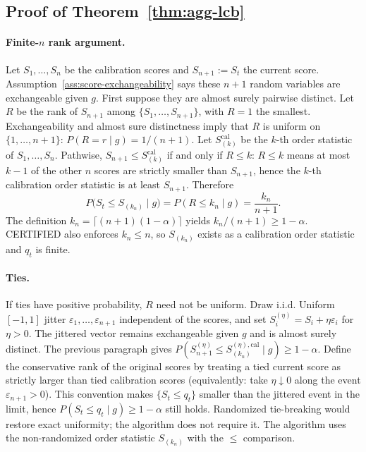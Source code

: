 \subsection{Proof of Theorem~\ref{thm:agg-lcb}}
\label{app:proof_agg_lcb}

\paragraph{Finite-$n$ rank argument.}
Let $S_1,\ldots,S_n$ be the calibration scores and $S_{n+1}:=S_t$ the current
score.  Assumption~\ref{ass:score-exchangeability} says these $n+1$ random
variables are exchangeable given $g$.  First suppose they are almost surely
pairwise distinct.  Let $R$ be the rank of $S_{n+1}$ among
$\{S_1,\ldots,S_{n+1}\}$, with $R=1$ the smallest.  Exchangeability and almost
sure distinctness imply that $R$ is uniform on $\{1,\ldots,n+1\}$:
$P(R=r\mid g)=1/(n+1)$.  Let $S_{(k)}^{\mathrm{cal}}$ be the $k$-th order
statistic of $S_1,\ldots,S_n$.  Pathwise,
$S_{n+1}\le S_{(k)}^{\mathrm{cal}}$ if and only if $R\le k$: $R\le k$ means at
most $k-1$ of the other $n$ scores are strictly smaller than $S_{n+1}$, hence
the $k$-th calibration order statistic is at least $S_{n+1}$.  Therefore
\[
 P\bigl(S_t\le S_{(k_n)}\mid g\bigr)
 =
 P(R\le k_n\mid g)
 =
 \frac{k_n}{n+1}.
\]
The definition $k_n=\lceil(n+1)(1-\alpha)\rceil$ yields $k_n/(n+1)\ge 1-\alpha$.
CERTIFIED also enforces $k_n\le n$, so $S_{(k_n)}$ exists as a calibration
order statistic and $q_t$ is finite.

\paragraph{Ties.}
If ties have positive probability, $R$ need not be uniform.  Draw i.i.d.
Uniform$[-1,1]$ jitter $\varepsilon_1,\ldots,\varepsilon_{n+1}$ independent of
the scores, and set $S_i^{(\eta)}=S_i+\eta\varepsilon_i$ for $\eta>0$.  The
jittered vector remains exchangeable given $g$ and is almost surely distinct.
The previous paragraph gives
$P(S_{n+1}^{(\eta)}\le S_{(k_n)}^{(\eta),\mathrm{cal}}\mid g)\ge 1-\alpha$.
Define the conservative rank of the original scores by treating a tied current
score as strictly larger than tied calibration scores (equivalently: take
$\eta\downarrow 0$ along the event $\varepsilon_{n+1}>0$).  This convention
makes $\{S_t\le q_t\}$ smaller than the jittered event in the limit, hence
$P(S_t\le q_t\mid g)\ge 1-\alpha$ still holds.  Randomized tie-breaking would
restore exact uniformity; the algorithm does not require it.  The algorithm
uses the non-randomized order statistic $S_{(k_n)}$ with the $\le$ comparison.

